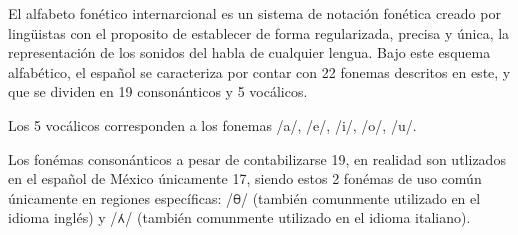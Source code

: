 \justifying
El alfabeto fonético internarcional es un sistema de notación fonética creado por lingüistas con el proposito de establecer de forma regularizada, precisa y única, la representación de los sonidos del habla de cualquier lengua. Bajo este esquema alfabético, el español se caracteriza por contar con 22 fonemas descritos en este, y que se dividen en 19 consonánticos y 5 vocálicos.

\hfill \break
\justifying
Los 5 vocálicos corresponden a los fonemas /a/, /e/, /i/, /o/, /u/.

\hfill \break
\justifying
Los fonémas consonánticos a pesar de contabilizarse 19, en realidad son utlizados en el español de México únicamente 17, siendo estos 2 fonémas de uso común únicamente en regiones específicas: /\includegraphics[width=6pt]{Imagenes/fricativa_dental_sorda.png}/ (también comunmente utilizado en el idioma inglés) y /\includegraphics[width=6pt]{Imagenes/aproximante_lateral_palatal.png}/ (también comunmente utilizado en el idioma italiano).


